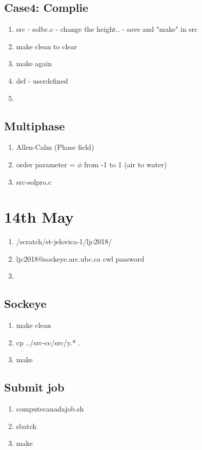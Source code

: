 \documentclass[12pt]{article} %
\begin{document}
\subsection{Case4: Complie}
\begin{enumerate}
    \item src - solbc.c - change the height.. - save and "make" in src
    \item make clean to clear
    \item make again
    \item def - userdefined 
    \item 
\end{enumerate}
\subsection{Multiphase}
\begin{enumerate}
    \item Allen-Calm (Phase field)
    \item order parameter = $\phi$ from -1 to 1 (air to water)
    \item src-solpro.c 
\end{enumerate}

\section{14th May}
\begin{enumerate}
    \item /scratch/st-jelovica-1/ljc2018/
    \item ljc2018@sockeye.arc.ubc.ca cwl password
    \item 
\end{enumerate}
\subsection{Sockeye}
\begin{enumerate}
    \item make clean
    \item cp ../src-cc/src/y.* .
    \item make
\end{enumerate}
\subsection{Submit job}
\begin{enumerate}
    \item computecanadajob.sh
    \item sbatch
    \item make
\end{enumerate}
\end{document}
